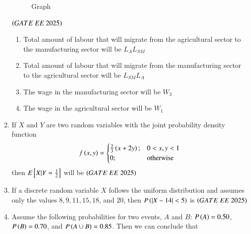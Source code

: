 \documentclass[journal,12pt,onecolumn]{IEEEtran}
\theoremstyle{remark}
\begin{document}
\begin{enumerate}
\begin{figure}[H]
\vspace{0.2cm}
\caption{Graph}
\end{figure}
\hfill $\left(GATE\ EE\ 2025\right)$
\begin{enumerate}
   \item Total amount of labour that will migrate from the agricultural sector to the manufacturing sector will be $L_A L_{SM}$
    \item Total amount of labour that will migrate from the manufacturing sector to the agricultural sector will be $L_{SM} L_A$
    \item The wage in the manufacturing sector will be $W_3$
    \item The wage in the agricultural sector will be $W_1$
\end{enumerate}
\item If $X$ and $Y$ are two random variables with the joint probability density function 
\begin{align}
f \left(x, y\right) =
\begin{cases}
\frac{2}{3} \left(x + 2y\right); & 0 < x, y < 1 \\
0; & \text{otherwise}
\end{cases}
\end{align}
then $E{}\left[X|Y=\frac{1}{2}\right]$ will be
\hfill $\left(GATE\ EE\ 2025\right)$
\begin{enumerate}
\end{enumerate}
\item If a discrete random variable $X$ follows the uniform distribution and assumes only the values $8, 9, 11, 15, 18$, and $20$, then $P \left(|X - 14| < 5\right)$ is
\hfill $\left(GATE\ EE\ 2025\right)$
\begin{enumerate}
\end{enumerate}
\item Assume the following probabilities for two events, $A$ and $B$: $P \left(A\right) = 0.50$, $P \left(B\right) = 0.70$, and $P \left(A \cup B\right) = 0.85$. Then we can conclude that

\end{enumerate}
\end{document}
